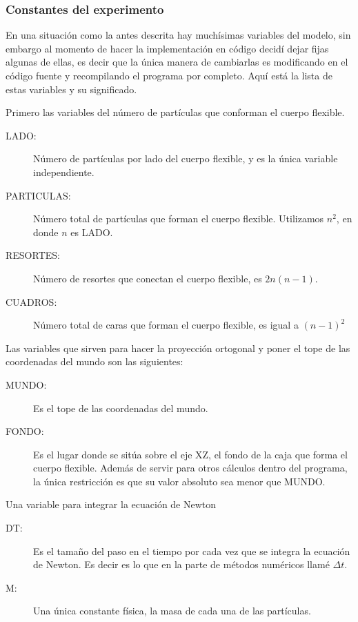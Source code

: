 \subsubsection{Constantes del experimento}
En una situación como la antes descrita hay muchísimas variables del modelo, sin embargo al momento de hacer la implementación en código decidí dejar fijas algunas de ellas, es decir que la única manera de cambiarlas es modificando en el código fuente y recompilando el programa por completo. Aquí está la lista de estas variables y su significado.

Primero las  variables del número de partículas que conforman el cuerpo flexible.

\begin{description}
 \item[LADO:] Número de partículas por lado del cuerpo flexible, y es la única variable independiente.
 \item[PARTICULAS:] Número total de partículas que forman el cuerpo flexible. Utilizamos $n^{2}$, en donde $n$ es LADO.
 \item[RESORTES:]Número de resortes que conectan el cuerpo flexible, es $2n(n - 1)$.
 \item[CUADROS:]Número total de caras que forman el cuerpo flexible, es igual a $(n - 1)^{2}$
\end{description}

Las variables que sirven para hacer la proyección ortogonal y poner el tope de las coordenadas del mundo son las siguientes:
\begin{description}
 \item[MUNDO:] Es el tope de las coordenadas del mundo.
 \item[FONDO:] Es el lugar donde se sitúa sobre el eje XZ, el fondo de la caja que forma el cuerpo flexible. Además de servir para otros cálculos dentro del programa, la única restricción es que su valor absoluto sea menor que MUNDO.
\end{description}

Una variable para integrar la ecuación de Newton 
\begin{description}
 \item[DT:] Es el tamaño del paso en el tiempo por cada vez que se integra la ecuación de Newton. Es decir es lo que en la parte de métodos numéricos llamé $\Delta t$.
\end{description}

\begin{description}
 \item[M:] Una única constante física, la masa de cada una de las partículas.
\end{description}
 
